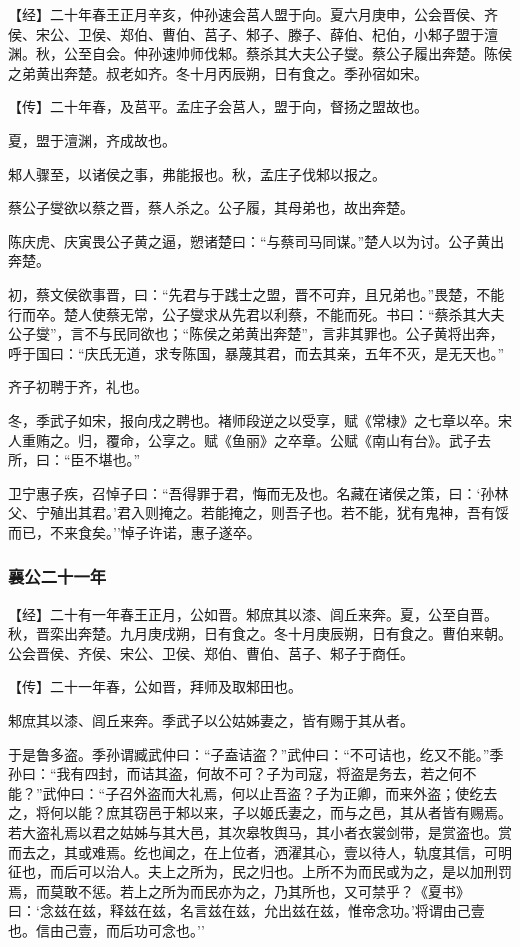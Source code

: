 \documentclass[]{article}
\begin{document}
【经】二十年春王正月辛亥，仲孙速会莒人盟于向。夏六月庚申，公会晋侯、齐侯、宋公、卫侯、郑伯、曹伯、莒子、邾子、滕子、薛伯、杞伯，小邾子盟于澶渊。秋，公至自会。仲孙速帅师伐邾。蔡杀其大夫公子燮。蔡公子履出奔楚。陈侯之弟黄出奔楚。叔老如齐。冬十月丙辰朔，日有食之。季孙宿如宋。

【传】二十年春，及莒平。孟庄子会莒人，盟于向，督扬之盟故也。

夏，盟于澶渊，齐成故也。

邾人骤至，以诸侯之事，弗能报也。秋，孟庄子伐邾以报之。

蔡公子燮欲以蔡之晋，蔡人杀之。公子履，其母弟也，故出奔楚。

陈庆虎、庆寅畏公子黄之逼，愬诸楚曰：``与蔡司马同谋。''楚人以为讨。公子黄出奔楚。

初，蔡文侯欲事晋，曰：``先君与于践士之盟，晋不可弃，且兄弟也。''畏楚，不能行而卒。楚人使蔡无常，公子燮求从先君以利蔡，不能而死。书曰：``蔡杀其大夫公子燮''，言不与民同欲也；``陈侯之弟黄出奔楚''，言非其罪也。公子黄将出奔，呼于国曰：``庆氏无道，求专陈国，暴蔑其君，而去其亲，五年不灭，是无天也。''

齐子初聘于齐，礼也。

冬，季武子如宋，报向戌之聘也。褚师段逆之以受享，赋《常棣》之七章以卒。宋人重贿之。归，覆命，公享之。赋《鱼丽》之卒章。公赋《南山有台》。武子去所，曰：``臣不堪也。''

卫宁惠子疾，召悼子曰：``吾得罪于君，悔而无及也。名藏在诸侯之策，曰：`孙林父、宁殖出其君。'君入则掩之。若能掩之，则吾子也。若不能，犹有鬼神，吾有馁而已，不来食矣。''悼子许诺，惠子遂卒。

\hypertarget{header-n2103}{%
\subsubsection{襄公二十一年}\label{header-n2103}}

【经】二十有一年春王正月，公如晋。邾庶其以漆、闾丘来奔。夏，公至自晋。秋，晋栾出奔楚。九月庚戌朔，日有食之。冬十月庚辰朔，日有食之。曹伯来朝。公会晋侯、齐侯、宋公、卫侯、郑伯、曹伯、莒子、邾子于商任。

【传】二十一年春，公如晋，拜师及取邾田也。

邾庶其以漆、闾丘来奔。季武子以公姑姊妻之，皆有赐于其从者。

于是鲁多盗。季孙谓臧武仲曰：``子盍诘盗？''武仲曰：``不可诘也，纥又不能。''季孙曰：``我有四封，而诘其盗，何故不可？子为司寇，将盗是务去，若之何不能？''武仲曰：``子召外盗而大礼焉，何以止吾盗？子为正卿，而来外盗；使纥去之，将何以能？庶其窃邑于邾以来，子以姬氏妻之，而与之邑，其从者皆有赐焉。若大盗礼焉以君之姑姊与其大邑，其次皋牧舆马，其小者衣裳剑带，是赏盗也。赏而去之，其或难焉。纥也闻之，在上位者，洒濯其心，壹以待人，轨度其信，可明征也，而后可以治人。夫上之所为，民之归也。上所不为而民或为之，是以加刑罚焉，而莫敢不惩。若上之所为而民亦为之，乃其所也，又可禁乎？《夏书》曰：`念兹在兹，释兹在兹，名言兹在兹，允出兹在兹，惟帝念功。'将谓由己壹也。信由己壹，而后功可念也。''
\end{document}
